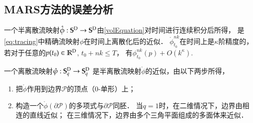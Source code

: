 \subsection{MARS方法的误差分析}

\begin{defn}
	一个半离散流映射$\mathring{ \phi} : \mathbb{S}^{\textup{D}}\rightarrow \mathbb{S}^{\textup{D}}$由\eqref{volEquation}对时间进行连续积分后所得，
	是\eqref{eq:tracing}中精确流映射$\phi$在时间上离散化后的近似．
	$\mathring{ \phi}_{t_0}^{nk}$在时间上是$\kappa$阶精度的，
	若对于任意的$p(t_0)\in \mathbb{R}^{\textup{D}}$, $t_0+nk\leq T$，
	有$\phi_{t_0}^{nk}(p)+O(k^{\kappa})$.
\end{defn}
\begin{defn}
	一个离散流映射$\mathring{\varphi} : \mathbb{S}_q^{\textup{D}}\rightarrow\mathbb{S}_q^{\textup{D}}$
	是半离散流映射$\mathring{ \phi}$的近似，由以下两步所得，
	\begin{enumerate}
		\item 把$\mathring{ \phi}$作用到边界$\mathcal{P}$的顶点（$0$-单形）上；
		\item 构造一个$\mathring{ \phi}(\partial\mathcal{P})$的多项式与$\partial \mathcal{P}$同胚．
		当$q=1$时，在二维情况下，边界由相连的直线近似；
		在三维情况下，边界由多个三角平面组成的多面体来近似．
	\end{enumerate}
\end{defn}

